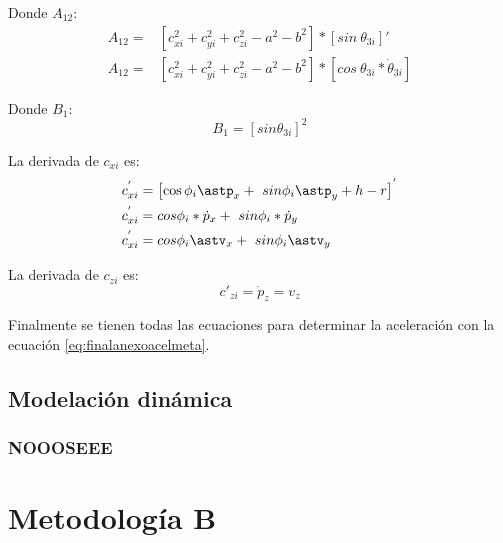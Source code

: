             Donde $A_{12}$:
            \begin{align*}
                 A_{12}=& \left[ c_{xi}^{2}+c_{yi}^{2}+c_{zi}^{2}- a^{2}-b^{2} \right] \ast \left[ sin~ \theta _{3i} \right] ' \\
                 A_{12}=& \left[ c_{xi}^{2}+c_{yi}^{2}+c_{zi}^{2}- a^{2}-b^{2} \right] \ast \left[ cos~ \theta _{3i}\ast\dot{ \theta }_{3i} \right]
            \end{align*}

            Donde $B_{1}$:
            \begin{equation*}
                B_{1}= \left[ sin  \theta _{3i} \right] ^{2}
            \end{equation*}

                        \newpage

            La derivada de $c_{xi}$ es:
            \begin{align*}
                 c_{xi}^{'}&= \left[ \cos  \phi _{i}\astp_{x}+~ sin \phi _{i}\astp_{y}+h-r \right] ^{'} \\
                 c_{xi}^{'}&=cos \phi _{i}\ast\dot{p}_{x}+~ sin \phi _{i}\ast\dot{p}_{y} \\
                 c_{xi}^{'}&=cos \phi _{i}\astv_{x}+~ sin \phi _{i}\astv_{y}
            \end{align*}

            La derivada de $c_{zi}$ es:
            \begin{equation*}
                c'_{zi}=\dot{p}_{z}=v_{z}       
            \end{equation*}

        Finalmente se tienen todas las ecuaciones para determinar la aceleración con la ecuación \ref{eq:finalanexoacelmeta}.
    \newpage

  \subsection{Modelación dinámica}
        \subsubsection{NOOOSEEE}
    \newpage

        
        
        
        
    \section{Metodología B}
